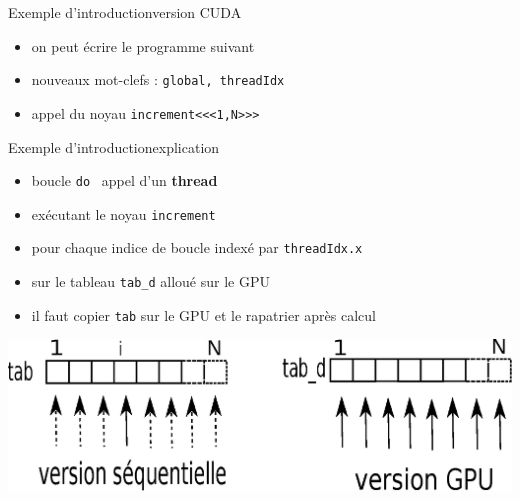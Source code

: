 \documentclass[11pt,mathserif]{beamer}
\newcommand{\gezi}{\faLongArrowRight}
\newcommand{\argi}{\faLightbulbO}
\newcommand{\kontuz}{\faExclamationTriangle}
\newcommand{\pozik}{\faSmileO}
\newcommand{\adibi}{\faCommentO}
\newif\ifC
\newcommand{\extcu}{cu}
\newcommand{\spt}{.}
\newcommand{\extcu}{cuf}
\newcommand{\spt}{\%}
\newcommand{\includeSrcCu}[1]{}
\begin{document}
\begin{frame}{Exemple d'introduction}{version CUDA}
\pause
\begin{itemize}[<+->]
  \item[\adibi] on peut écrire le programme suivant
\includeSrcCu{code/increment}
\ifC \item[\pozik] plus de boucle \fi
\item[\argi] nouveaux mot-clefs : \ifC \texttt{\_\_global\_\_, threadIdx} \else
\texttt{global, threadIdx} \fi
\item[\argi] appel du noyau \texttt{increment<<<1,N>>>}
\ifC
\item[\argi] gestion de la mémoire : \texttt{\small cudaMemcpy, cudaMalloc, cudaFree}
\fi
\end{itemize}
\end{frame}

\begin{frame}{Exemple d'introduction}{explication}
\pause
\begin{itemize}[<+->]
 \item[\argi] boucle \ifC \texttt{for} \else \texttt{do} \fi  \gezi\ appel d'un {\bf thread}
 \item[\argi] exécutant le noyau \texttt{increment}
 \item[\argi] pour chaque indice de boucle indexé par \texttt{threadIdx\spt x} 
 \item[\argi] sur le tableau \texttt{tab\_d} alloué sur le GPU
 \item[\kontuz] il faut copier \texttt{tab} sur le GPU et le rapatrier après calcul
\end{itemize}
\pause
\begin{center}
\includegraphics[width=0.9\linewidth]{fig/parallel.eps}
\end{center}
\end{frame}
\end{document}
